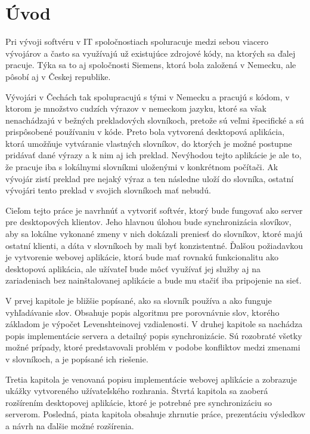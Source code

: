\documentclass[
  digital, %
  table,   %
  lof,     %
  lot,     %
]{fithesis3}
\begin{document}
\chapter{Úvod}
Pri vývoji softvéru v IT spoločnostiach spoluracuje medzi sebou viacero vývojárov a často sa využívajú už existujúce zdrojové kódy, na ktorých sa ďalej pracuje. Týka sa to aj spoločnosti Siemens, ktorá bola založená v Nemecku, ale pôsobí aj v Českej republike.

Vývojári v Čechách tak spolupracujú s tými v Nemecku a pracujú s kódom, v ktorom je množstvo cudzích výrazov v nemeckom jazyku, ktoré sa však nenachádzajú v bežných prekladových slovníkoch, pretože sú veľmi špecifické a sú prispôsobené používaniu v kóde. Preto bola vytvorená desktopová aplikácia, ktorá umožňuje vytváranie vlastných slovníkov, do ktorých je možné postupne pridávať dané výrazy a k nim aj ich preklad. Nevýhodou tejto aplikácie je ale to, že pracuje iba s lokálnymi slovníkmi uloženými v konkrétnom počítači. Ak vývojár zistí preklad pre nejaký výraz a ten následne uloží do slovníka, ostatní vývojári tento preklad v svojich slovníkoch mať nebudú.

Cieľom tejto práce je navrhnúť a vytvoriť softvér, ktorý bude fungovať ako server pre desktopových klientov. Jeho hlavnou úlohou bude synchronizácia slovíkov, aby sa lokálne vykonané zmeny v nich dokázali preniesť do slovníkov, ktoré majú ostatní klienti, a dáta v slovníkoch by mali byť konzistentné. Ďalšou požiadavkou je vytvorenie webovej aplikácie, ktorá bude mať rovnakú funkcionalitu ako desktopová aplikácia, ale užívateľ bude môcť využívať jej služby aj na zariadeniach bez nainštalovanej aplikácie a bude mu stačiť iba pripojenie na sieť.

V prvej kapitole je bližšie popísané, ako sa slovník používa a ako funguje vyhľadávanie slov. Obsahuje popis algoritmu pre porovnávnie slov, ktorého základom je výpočet Levenshteinovej vzdialenosti. V druhej kapitole sa nachádza popis implementácie servera a detailný popis synchronizácie. Sú rozobraté všetky možné prípady, ktoré predstavovali problém v podobe konfliktov medzi zmenami v slovníkoch, a je popísané ich riešenie.

Tretia kapitola je venovaná popisu implementácie webovej aplikácie a zobrazuje ukážky vytvoreného užívateľského rozhrania. Štvrtá kapitola sa zaoberá rozšírením desktopovej aplikácie, ktoré je potrebné pre synchronizáciu so serverom. Posledná, piata kapitola obsahuje zhrnutie práce, prezentáciu výsledkov a návrh na ďalšie možné rozšírenia.
\end{document}
